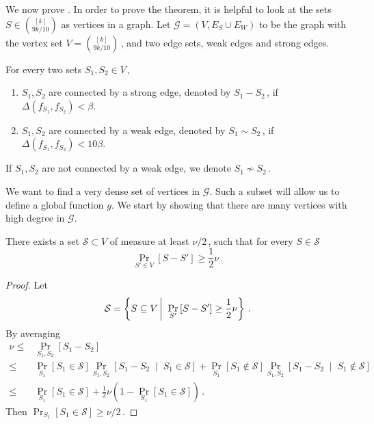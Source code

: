\documentclass{toc}
\newcommand{\Prob}[2][]{\Pr_{{#1}}\left[#2\right]} %
\newcommand{\Paren}[1]{\left(#1\right)} %
\newcommand{\given}{\;\middle\vert\;} %
\newcommand\sett[2]{\left\{ #1 \left| \; \vphantom{#1 #2} \right. #2  \right\}} %
\newcommand\setf{f} %
\newcommand\pf{g} %
\newcommand{\diff}{\Delta} %
\newcommand\wconn{\sim} %
\newcommand\sconn{-} %
\begin{document}
We now prove .
In order to prove the theorem, it is helpful to look at the sets $S\in\binom{[k]}{9k/10}$ as vertices in a graph. Let $\mathcal{G}=(V,E_S\cup E_W)$ to be the graph with the vertex set $V=\binom{[k]}{9k/10}$\,, and two edge sets, weak edges and strong edges.
\begin{definition}
	For every two sets $S_1,S_2\in V$\,,
	\begin{enumerate}
		\item $S_1,S_2$ are connected by a strong edge, denoted by $S_1\sconn S_2$\,, if $\diff(\setf_{S_1},\setf_{S_2}) < \beta$.
		\item $S_1,S_2$ are connected by a weak edge, denoted by $S_1\wconn S_2$\,, if $\diff(\setf_{S_1},\setf_{S_2}) < 10\beta$.
	\end{enumerate}
	If $S_1,S_2$ are not connected by a weak edge, we denote $S_1 \not\wconn S_2$\,. %
\end{definition}

We want to find a very dense set of vertices in $\mathcal{G}$. Such a subset will allow us to define a global function $\pf$. We start by showing that there are many vertices with high degree in $\mathcal{G}$.
\begin{claim}\label{claim:star}
	There exists a set $\mathcal{S}\subset V$  of measure at least 
	$\nu/2$\,, %
  such that for every $S\in\mathcal{S}$  \[\Prob[S'\in V]{S\sconn S'} \geq\frac{1}{2}\nu\,.\]
\end{claim}
\begin{proof}
	Let
	\[\mathcal{S} = \sett{S\subseteq V}{\Prob[S']{S\sconn S'} \geq \frac{1}{2}\nu}\,. \]%
	By averaging
	\begin{align*}
	\nu \leq&  \Prob[S_1,S_2]{S_1\sconn S_2}
	\\ \leq& \Prob[S_1]{S_1\in\mathcal{S}}\Prob[S_1,S_2]{S_1\sconn S_2\given S_1\in\mathcal{S}} +\Prob[S_1]{S_1\notin\mathcal{S}}\Prob[S_1,S_2]{S_1\sconn S_2\given S_1\notin\mathcal{S}}
	\\ \leq&  \Prob[S_1]{S_1\in\mathcal{S}} + \frac{1}{2}\nu\Paren{1-\Prob[S_1]{S_1\in\mathcal{S}}}\,.%
	\end{align*}
	Then $\Prob[S_1]{S_1\in\mathcal{S}} \geq 
	\nu/2$\,. %
\end{proof}
\end{document}
